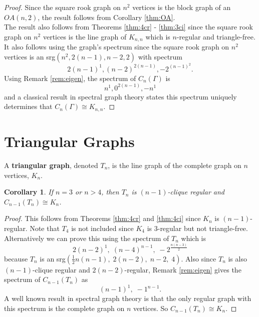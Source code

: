 \documentclass[12pt]{report}
\newtheorem{cor}[thm]{Corollary}
\theoremstyle{definition}
\begin{document}
\begin{proof} 
    Since the square rook graph on $n^2$ vertices is the block graph of an $OA(n,2)$, the result follows from Corollary \ref{thm:OA}.\\
    The result also follows from Theorems \ref{thm:4cr} - \ref{thm:3ci} since the square rook graph on $n^2$ vertices is the line graph of $K_{n,n}$ which is $n$-regular and triangle-free.\\
    It also follows using the graph's spectrum since the square rook graph on $n^2$ vertices is an srg$(n^2, 2(n-1), n-2, 2)$ with spectrum \[2(n-1)^1,(n-2)^{2(n-1)}, -2^{(n-1)^2}.\] Using Remark \ref{rem:eigen}, the spectrum of $C_n(\Gamma)$ is \[n^1, 0^{2(n-1)}, -n^1\] and a classical result in spectral graph theory states this spectrum uniquely determines that $C_n(\Gamma) \cong K_{n,n}$.
\end{proof}
\section{Triangular Graphs}
 A \textbf{triangular graph}, denoted $T_n$, is the line graph of the complete graph on $n$ vertices, $K_n$. 
\begin{cor}
    If $n = 3$ or $n>4$, then $T_n$ is $(n-1)$-clique regular and $C_{n-1}(T_n) \cong K_n$.\\
\end{cor}
\begin{proof}
    This follows from Theorems \ref{thm:4cr} and \ref{thm:4ci} since $K_n$ is $(n-1)$-regular. Note that $T_4$ is not included since $K_4$ is $3$-regular but not triangle-free.\\
    Alternatively we can prove this using the spectrum of $T_n$ which is \[2(n-2)^1,\;(n-4)^{n-1},\;-2^{\frac{n(n-3)}{2}}\]
    because $T_n$ is an srg$(\frac{1}{2}n(n - 1),\; 2(n - 2),\; n - 2,\; 4)$.
    Also since $T_n$ is also $(n-1)$-clique regular and $2(n-2)$-regular, Remark \ref{rem:eigen} gives the spectrum of $C_{n-1}(T_n)$ as \[ (n-1)^1,\; -1^{n-1}.\]
    A well known result in spectral graph theory is that the only regular graph with this spectrum is the complete graph on $n$ vertices. So $C_{n-1}(T_n) \cong K_n$.
\end{proof}
\end{document}
